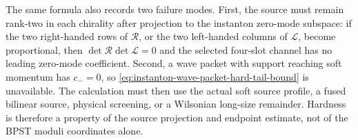 \begin{controlledapproximation}
The same formula also records two failure modes.  First, the source must
remain rank-two in each chirality after projection to the instanton
zero-mode subspace: if the two right-handed rows of \(\mathcal R\), or the
two left-handed columns of \(\mathcal L\), become proportional, then
\(\det\mathcal R\det\mathcal L=0\) and the selected four-slot channel has no
leading zero-mode coefficient.  Second, a wave packet with support reaching
soft momentum has \(c_-=0\), so
\eqref{eq:instanton-wave-packet-hard-tail-bound} is unavailable.  The
calculation must then use the actual soft source profile, a fused bilinear
source, physical screening, or a Wilsonian long-size remainder.  Hardness is
therefore a property of the source projection and endpoint estimate, not of
the BPST moduli coordinates alone.
\end{controlledapproximation}

